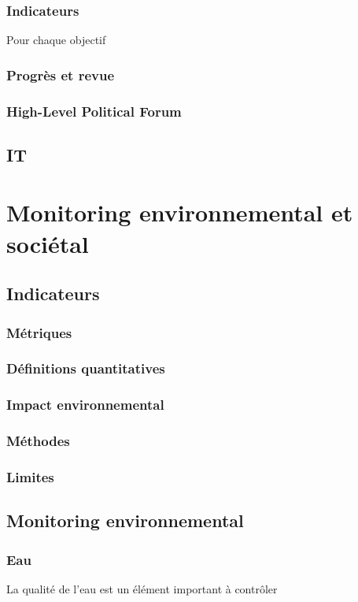 \documentclass[a4paper,11pt,titlepage]{article}
\begin{document}
			\subsubsection{Indicateurs}
			Pour chaque objectif
			\subsubsection{Progrès et revue}
			\subsubsection{High-Level Political Forum}
			
		\subsection{IT}
	
	\section{Monitoring environnemental et sociétal}
		\subsection{Indicateurs}
			\subsubsection{Métriques}
			\subsubsection{Définitions quantitatives}
			\subsubsection{Impact environnemental}
			\subsubsection{Méthodes}			
			\subsubsection{Limites}
			
		\subsection{Monitoring environnemental}
			\subsubsection{Eau}
				La qualité de l'eau est un élément important à contrôler
\end{document}
